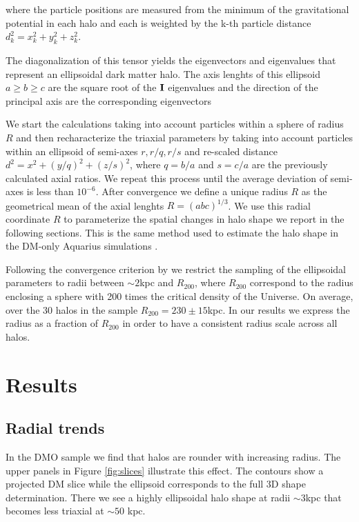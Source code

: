 \documentclass[usenatbib]{mnras}
\begin{document}
where the particle positions are measured from the minimum of the
gravitational potential in each halo and each is weighted by the k-th
particle distance $d_k^2=x_k^2+y_k^2+z_k^2$.

The diagonalization of this tensor yields the eigenvectors and
eigenvalues that represent an ellipsoidal dark matter halo.
The axis lenghts of this ellipsoid $a\geq b \geq c$ are the square
root of the ${\bf I}$ eigenvalues and the direction of the principal
axis are the corresponding eigenvectors 

We start the calculations taking into account particles within a
sphere of radius $R$ and then recharacterize the triaxial parameters
by taking into account particles within an ellipsoid of semi-axes
$r,r/q,r/s$ and re-scaled distance $d^2=x^2+(y/q)^2+(z/s)^2$, where $q
= b/a$ and $s=c/a$ are the previously calculated axial ratios. 
We repeat this process until the average deviation of semi-axes is
less than $10^{-6}$.  
After convergence we define a unique radius $R$ as the geometrical
mean of the axial lenghts $R=(abc)^{1/3}$.
We use this radial coordinate $R$ to parameterize the spatial changes
in halo shape we report in the following sections.
This is the same method used to estimate the halo shape in the DM-only
Aquarius simulations \citep{VeraCiro11}. 

Following the convergence criterion by \cite{VeraCiro11} we
restrict the sampling of the ellipsoidal parameters to radii between
$\sim 2$kpc and $R_{200}$, where  $R_{200}$ correspond to the radius
enclosing a sphere with 200 times the critical density of the Universe.
On average, over the 30 halos in the sample $R_{200}=230\pm 15$kpc. 
In our results we express the radius as a fraction of $R_{200}$ in
order to have a consistent radius scale across all halos.

\section{Results}
\label{sec:results}

\subsection{Radial trends}

In the DMO sample we find that halos are rounder with increasing
radius.
The upper panels in Figure \ref{fig:slices} illustrate this effect.
The contours show a projected DM slice while the ellipsoid corresponds
to the full 3D shape determination. 
There we see a highly ellipsoidal halo shape at radii $\sim 3$kpc
that becomes less triaxial at $\sim 50$ kpc.
\end{document}
